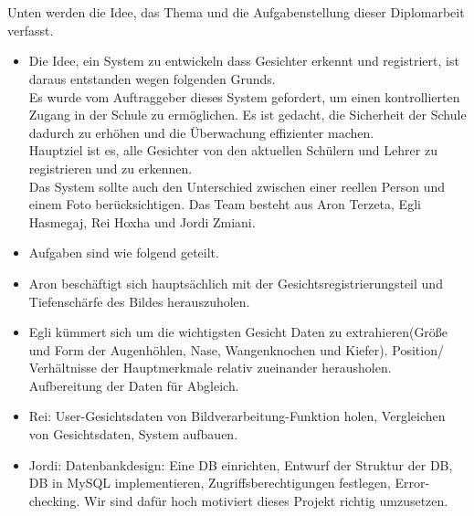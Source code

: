 \chapter{\docname}
\label{\docname}

\color{black}
Unten werden die Idee, das Thema und die Aufgabenstellung dieser Diplomarbeit verfasst.

\begin{itemize}
	\item[] Die Idee, ein System zu entwickeln dass Gesichter erkennt und registriert, ist daraus entstanden wegen folgenden Grunds. \\
	Es wurde vom Auftraggeber dieses System gefordert, um einen kontrollierten Zugang in der Schule zu ermöglichen. Es ist gedacht, die Sicherheit der Schule dadurch zu erhöhen und die Überwachung effizienter machen. \\
	Hauptziel ist es, alle Gesichter von den aktuellen Schülern und Lehrer zu registrieren und zu erkennen. \\
	Das System sollte auch den Unterschied zwischen einer reellen Person und einem Foto berücksichtigen. 
	Das Team besteht aus Aron Terzeta, Egli Hasmegaj, Rei Hoxha und Jordi Zmiani. 
	
	\item Aufgaben sind wie folgend geteilt. 
	\item Aron beschäftigt sich hauptsächlich mit der Gesichtsregistrierungsteil und Tiefenschärfe des Bildes herauszuholen. 
	\item Egli kümmert sich um die wichtigsten Gesicht Daten zu extrahieren(Größe und Form der Augenhöhlen, Nase, Wangenknochen und Kiefer). Position/ Verhältnisse der Hauptmerkmale relativ zueinander herausholen.  Aufbereitung der Daten für Abgleich.
	\item Rei: User-Gesichtsdaten von Bildverarbeitung-Funktion holen, Vergleichen von Gesichtsdaten, System aufbauen.
	\item Jordi: Datenbankdesign: Eine DB einrichten, Entwurf der Struktur der DB, DB in MySQL implementieren, Zugriffsberechtigungen festlegen, Error-checking.
	Wir sind dafür hoch motiviert dieses  Projekt richtig umzusetzen. 
	
\end{itemize}

\color{black}
